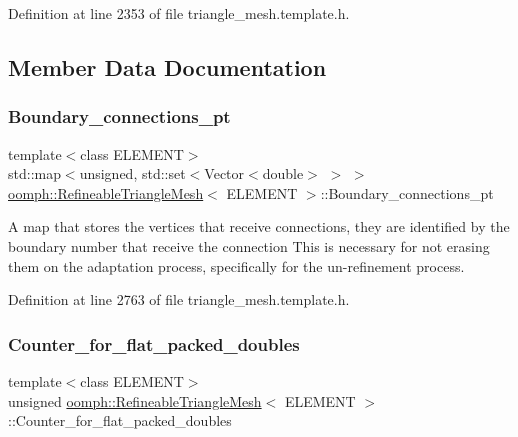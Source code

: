 Definition at line 2353 of file triangle\+\_\+mesh.\+template.\+h.



\subsection{Member Data Documentation}
\mbox{\label{classoomph_1_1RefineableTriangleMesh_a099ddd14a05c116188ecc3d6ec2f68d1}} 
\subsubsection{\texorpdfstring{Boundary\+\_\+connections\+\_\+pt}{Boundary\_connections\_pt}}
{\footnotesize\ttfamily template$<$class E\+L\+E\+M\+E\+NT$>$ \\
std\+::map$<$unsigned, std\+::set$<$Vector$<$double$>$ $>$ $>$ \hyperlink{classoomph_1_1RefineableTriangleMesh}{oomph\+::\+Refineable\+Triangle\+Mesh}$<$ E\+L\+E\+M\+E\+NT $>$\+::Boundary\+\_\+connections\+\_\+pt\hspace{0.3cm}{\ttfamily [protected]}}



A map that stores the vertices that receive connections, they are identified by the boundary number that receive the connection This is necessary for not erasing them on the adaptation process, specifically for the un-\/refinement process. 



Definition at line 2763 of file triangle\+\_\+mesh.\+template.\+h.

\mbox{\label{classoomph_1_1RefineableTriangleMesh_a5fc09234e6d14789d597b40fd66b3d4f}} 
\subsubsection{\texorpdfstring{Counter\+\_\+for\+\_\+flat\+\_\+packed\+\_\+doubles}{Counter\_for\_flat\_packed\_doubles}}
{\footnotesize\ttfamily template$<$class E\+L\+E\+M\+E\+NT$>$ \\
unsigned \hyperlink{classoomph_1_1RefineableTriangleMesh}{oomph\+::\+Refineable\+Triangle\+Mesh}$<$ E\+L\+E\+M\+E\+NT $>$\+::Counter\+\_\+for\+\_\+flat\+\_\+packed\+\_\+doubles\hspace{0.3cm}{\ttfamily [protected]}}



